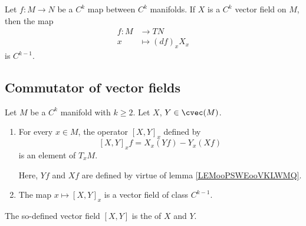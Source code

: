 \begin{proposition}		\label{PROPooNTSLooCXQQXy}
	Let \(f \colon M\to N  \) be a \( C^k\) map between \( C^k\) manifolds. If \( X\) is a \( C^k\) vector field on \( M\), then the map
	\begin{equation}
		\begin{aligned}
			f\colon M & \to TN            \\
			x         & \mapsto (df)_xX_x
		\end{aligned}
	\end{equation}
	is \( C^{k-1}\).
\end{proposition}

\subsection{Commutator of vector fields}


\begin{propositionDef}      \label{DEFooHOTOooRaPwyo}
	Let \( M\) be a \( C^k\) manifold with \( k\geq 2\). Let $X$, $Y\in\cvec(M)$.
	\begin{enumerate}
		\item       \label{ITEMooZKKUooQjYftU}
		      For every \( x\in M\), the operator \( [X,Y]_x\) defined by
		      \begin{equation}        \label{EQooDSKWooXdjPPP}
			      [X,Y]_xf=X_x(Yf)-Y_x(Xf)
		      \end{equation}
		      is an element of \( T_xM\).

		      Here, \( Yf\) and \( Xf\) are defined by virtue of lemma \ref{LEMooPSWEooVKLWMQ}.
		\item       \label{ITEMooPGPLooQrKxWY}
		      The map \( x\mapsto [X,Y]_x\) is a vector field of class \( C^{k-1}\).
	\end{enumerate}

	The so-defined vector field \( [X,Y]\) is the  of \( X\) and \( Y\).
\end{propositionDef}

